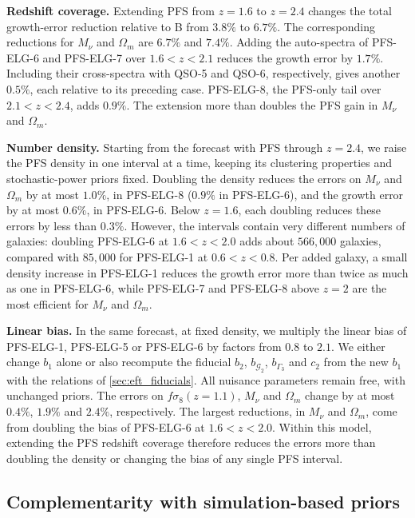 \documentclass[a4paper,11pt]{article}
\newcommand{\revchange}[1]{{\color{RevisionColor}#1}}
\newcommand{\Om}{\Omega_m}
\newcommand{\se}{\ensuremath{\sigma_{8}}\xspace}
\newcommand{\G}{\mathcal{G}}
\newcommand{\Mnu}{M_\nu}
\begin{document}
\revchange{\textbf{Redshift coverage.} Extending PFS from $z=1.6$ to $z=2.4$ changes the total
growth-error reduction relative to B
from $3.8\%$ to $6.7\%$.
The corresponding reductions for $\Mnu$ and $\Om$ are
$6.7\%$ and $7.4\%$.
Adding the auto-spectra of PFS-ELG-6 and PFS-ELG-7 over
$1.6<z<2.1$ reduces the growth error by $1.7\%$. Including their
cross-spectra with QSO-5 and QSO-6, respectively, gives another
$0.5\%$, each relative to its preceding case. PFS-ELG-8, the PFS-only tail over
$2.1<z<2.4$, adds $0.9\%$.
The extension more than doubles the PFS gain in $\Mnu$ and $\Om$.

\textbf{Number density.} Starting from the forecast with PFS through
$z=2.4$, we raise the PFS density in one interval at a time, keeping its
clustering properties and stochastic-power priors fixed. Doubling the
density reduces the errors on $\Mnu$ and $\Om$ by at most $1.0\%$, in
PFS-ELG-8 ($0.9\%$ in PFS-ELG-6), and the growth error by at most
$0.6\%$, in PFS-ELG-6. Below $z=1.6$, each doubling reduces these errors
by less than $0.3\%$. However, the intervals contain very different
numbers of galaxies: doubling PFS-ELG-6 at $1.6<z<2.0$ adds about
$566{,}000$ galaxies, compared with $85{,}000$ for PFS-ELG-1 at
$0.6<z<0.8$. Per added galaxy, a small density increase in PFS-ELG-1
reduces the growth error more than twice as much as one in PFS-ELG-6,
while PFS-ELG-7 and PFS-ELG-8 above $z=2$ are the most efficient for
$\Mnu$ and $\Om$.

\textbf{Linear bias.} In the same forecast, at fixed density, we multiply
the linear bias of PFS-ELG-1, PFS-ELG-5 or PFS-ELG-6 by factors from $0.8$
to $2.1$. We either change $b_1$ alone or also recompute the fiducial $b_2$,
$b_{\G_2}$, $b_{\Gamma_3}$ and $c_2$ from the new $b_1$ with the relations of
\cref{sec:eft_fiducials}. All nuisance parameters remain free, with unchanged
priors. The errors on
$f\se(z=1.1)$, $\Mnu$ and $\Om$ change by at most $0.4\%$, $1.9\%$ and
$2.4\%$, respectively. The largest reductions, in $\Mnu$ and $\Om$, come
from doubling the bias of PFS-ELG-6 at $1.6<z<2.0$. Within this model,
extending the PFS redshift coverage therefore reduces the errors more than
doubling the density or changing the bias of any single PFS interval.}


\subsection{Complementarity with simulation-based priors}
\end{document}
